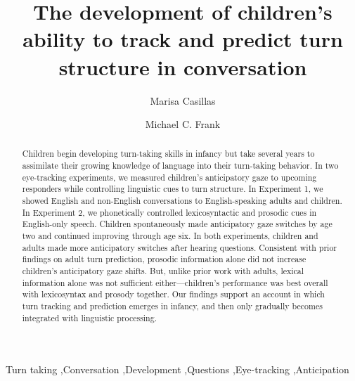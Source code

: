 \documentclass[authoryear, 12pt]{elsarticle}
\begin{document}
\begin{frontmatter}

\title{The development of children's ability to track and predict turn structure in conversation}

\author[MPI]{Marisa Casillas}
\address[MPI]{Max Planck Institute for Psycholinguistics, Nijmegen}

\author[StanfordPSY]{Michael C. Frank}

\address[StanfordPSY]{Department of Psychology, Stanford University}

\begin{abstract}
Children begin developing turn-taking skills in infancy but take several years to assimilate their growing knowledge of language into their turn-taking behavior. In two eye-tracking experiments, we measured children's anticipatory gaze to upcoming responders while controlling linguistic cues to turn structure. In Experiment 1, we showed English and non-English conversations to English-speaking adults and children. In Experiment 2, we phonetically controlled lexicosyntactic and prosodic cues in English-only speech. Children spontaneously made anticipatory gaze switches by age two and continued improving through age six. In both experiments, children and adults made more anticipatory switches after hearing questions. Consistent with prior findings on adult turn prediction, prosodic information alone did not increase children's anticipatory gaze shifts. But, unlike prior work with adults, lexical information alone was not sufficient either---children's performance was best overall with lexicosyntax and prosody together. Our findings support an account in which turn tracking and prediction emerges in infancy, and then only gradually becomes integrated with linguistic processing.
\end{abstract}

\begin{keyword}
Turn taking \sep Conversation \sep Development \sep Questions \sep Eye-tracking \sep Anticipation

\end{keyword}

\end{frontmatter}
\end{document}
